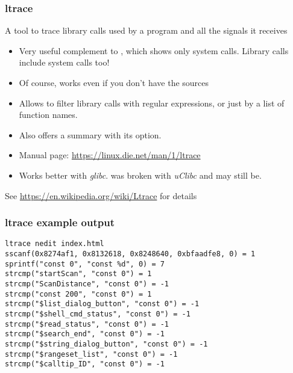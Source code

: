 \begin{frame}
  \frametitle{ltrace}
  A tool to trace library calls used by a program and all the signals
  it receives
  \begin{itemize}
  \item Very useful complement to , which shows only system
    calls. Library calls include system calls too!
  \item Of course, works even if you don't have the sources
  \item Allows to filter library calls with regular expressions, or
    just by a list of function names.
  \item Also offers a summary with its  option.
  \item Manual page: \url{https://linux.die.net/man/1/ltrace}
  \item Works better with {\em glibc}.  was broken
        with {\em uClibc} and may still be.
  \end{itemize}
  See \url{https://en.wikipedia.org/wiki/Ltrace} for details
\end{frame}

\begin{frame}[fragile]
  \frametitle{ltrace example output}
  \small
  \begin{block}{}
\begin{verbatim}
ltrace nedit index.html
sscanf(0x8274af1, 0x8132618, 0x8248640, 0xbfaadfe8, 0) = 1
sprintf("const 0", "const %d", 0) = 7
strcmp("startScan", "const 0") = 1
strcmp("ScanDistance", "const 0") = -1
strcmp("const 200", "const 0") = 1
strcmp("$list_dialog_button", "const 0") = -1
strcmp("$shell_cmd_status", "const 0") = -1
strcmp("$read_status", "const 0") = -1
strcmp("$search_end", "const 0") = -1
strcmp("$string_dialog_button", "const 0") = -1
strcmp("$rangeset_list", "const 0") = -1
strcmp("$calltip_ID", "const 0") = -1
\end{verbatim}
\end{block}
\end{frame}
